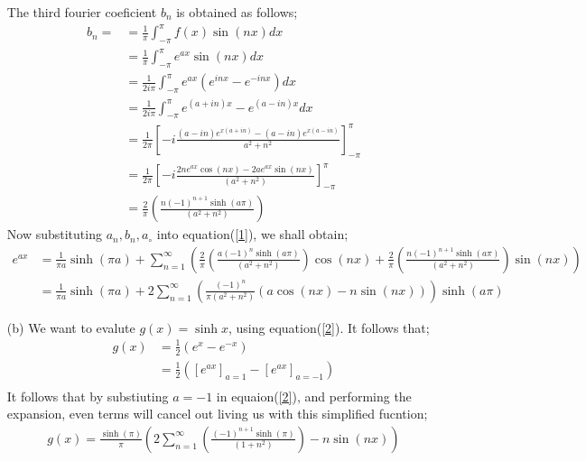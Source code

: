 \documentclass[12pt,a4paper]{article}
\begin{document}
\begin{itemize}
	The third fourier coeficient  $b_{n}$ is obtained as follows;
	\begin{align*}
	b_{n}=&=\frac{1}{\pi}\int_{-\pi}^{\pi}f(x)\sin(n x)dx\\
	&=\frac{1}{\pi}\int_{-\pi}^{\pi}e^{ax}\sin(n x)dx\\
	&=\frac{1}{2i\pi}\int_{-\pi}^{\pi}e^{ax}\left(e^{i n x}-e^{-in x}\right)dx\\
	&=\frac{1}{2i\pi}\int_{-\pi}^{\pi}e^{(a+in )x}-e^{(a-in)x}dx\\
	&=\frac{1}{2\pi}\left[-i\frac{ (a-in)e^{x(a+in)}-(a-in)e^{x(a-in)}}{a^{2}+n^{2}}\right]^{\pi}_{-\pi}\\
	&=\frac{1}{2\pi}\left[-i\frac{2ne^{ax}\cos(nx)-2ae^{ax}\sin(nx)}{\left(a^{2}+n^{2}\right)}\right]^{\pi}_{-\pi}\\
	&=\frac{2}{\pi}\left(\frac{n(-1)^{n+1}\sinh (a\pi)}{(a^{2}+n^{2})}\right)
	\end{align*}
	Now substituting $a_{n},b_{n}, a_{\circ}$ into equation(\ref{1}), we shall obtain;
	\begin{align}
	e^{ax}&=\frac{1}{\pi a} \sinh (\pi a)+\sum_{n=1}^{\infty}\left(\frac{2}{\pi}\left(\frac{a(-1)^{n}\sinh (a\pi)}{(a^{2}+n^{2})}\right)\cos(nx)+\frac{2}{\pi}\left(\frac{n(-1)^{n+1}\sinh (a\pi)}{(a^{2}+n^{2})}\right)\sin(nx)\right)\\
	&=\frac{1}{\pi a} \sinh (\pi a)+2\sum_{n=1}^{\infty}\left(\frac{(-1)^{n}}{\pi (a^{2}+n^{2})}(a\cos(nx)-n\sin(nx))\right)\sinh(a\pi) \label{2}
	\end{align}
	\item [(b)] We want to evalute $g(x)=\sinh x$, using equation(\ref{2}). It follows that;
	\begin{align*}
	g(x)&=\frac{1}{2}\left(e^{x}-e^{-x}\right)\\
	&=\frac{1}{2}\left([e^{ax}]_{a=1}-[e^{ax}]_{a=-1}\right)\\
	\end{align*}
	It follows that by substiuting $a=-1$ in equaion(\ref{2}), and performing the expansion, even terms will cancel out living us with this simplified fucntion;
	\begin{align*}
	g(x)=\frac{\sinh (\pi )}{\pi }\left(2\sum_{n=1}^{\infty}\left(\frac{(-1)^{n+1}\sinh (\pi)}{(1+n^{2})}\right)-n\sin(nx)\right)
	\end{align*}
\end{itemize}
\end{document}
